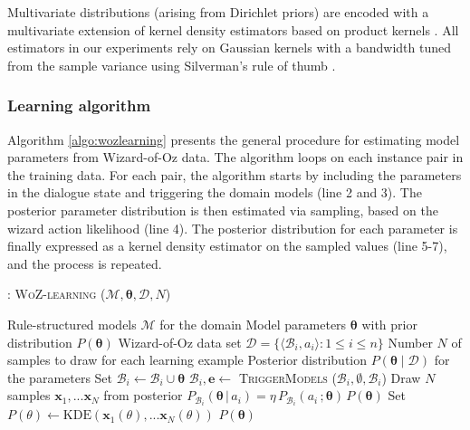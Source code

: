Multivariate distributions (arising from Dirichlet priors) are encoded with a multivariate extension of kernel density estimators based on product kernels \citep{Silverman1986}.  All estimators in our experiments rely on Gaussian kernels with a bandwidth tuned from the sample variance using Silverman's rule of thumb \citep{Silverman1986}. 


\subsubsection*{Learning algorithm}

Algorithm \ref{algo:wozlearning} presents the general procedure for estimating model parameters from Wizard-of-Oz data.  The algorithm loops on each instance pair in the training data.  For each pair, the algorithm starts by including the parameters in the dialogue state and triggering the domain models (line 2 and 3). The posterior parameter distribution is then estimated via sampling, based on the wizard action likelihood (line 4).  The posterior distribution for each parameter is finally expressed as a kernel density estimator on the sampled values (line 5-7), and the process is repeated. 

\begin{algorithm}[h!]
\caption{: \textsc{WoZ-learning} ($\mathcal{M}, \boldsymbol\theta, \mathcal{D}, N$)}
\begin{algorithmic}[1] \vspace{1mm}
\REQUIRE Rule-structured models $\mathcal{M}$ for the domain
\REQUIRE Model parameters $\boldsymbol\theta$ with prior distribution $P(\boldsymbol\theta)$
\REQUIRE Wizard-of-Oz data set $\mathcal{D} = \{\langle \mathcal{B}_i, a_i \rangle : 1 \leq i  \leq n\}$
\REQUIRE Number $N$ of samples to draw for each learning example
\ENSURE Posterior distribution $P(\boldsymbol\theta \; | \; \mathcal{D})$ for the parameters  \vspace{1mm}
\STATE Set $\mathcal{B}_i \leftarrow \mathcal{B}_i \cup \boldsymbol\theta$
\STATE $\mathcal{B}_i, \mathbf{e} \leftarrow$ \textsc{TriggerModels} ($\mathcal{B}_i, \emptyset,  \mathcal{B}_i$) 
\STATE Draw $N$ samples $\mathbf{x}_1,...\mathbf{x}_N$ from posterior $P_{\mathcal{B}_i}(\boldsymbol\theta \, | \, a_i) = \eta \, P_{\mathcal{B}_i}(a_i\,; \boldsymbol\theta) \, P(\boldsymbol\theta )$
\STATE Set $P(\theta) \leftarrow \mathrm{KDE}(\mathbf{x}_1(\theta),...\mathbf{x}_N(\theta))$
\ENDFOR
\ENDFOR
\RETURN $P(\boldsymbol\theta)$
\end{algorithmic}
\label{algo:wozlearning}
\end{algorithm}


